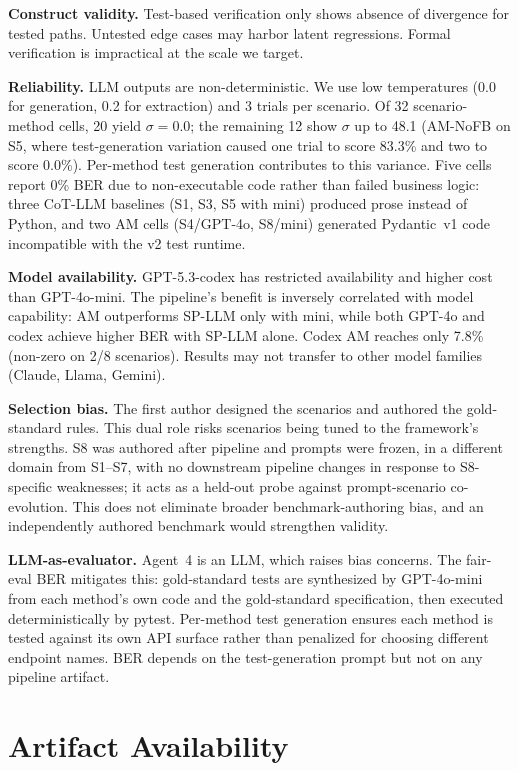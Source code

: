 \documentclass[conference]{IEEEtran}
\begin{document}
\textbf{Construct validity.} Test-based verification only shows absence of divergence for tested paths. Untested edge cases may harbor latent regressions. Formal verification is impractical at the scale we target.

\textbf{Reliability.} LLM outputs are non-deterministic. We use low temperatures (0.0 for generation, 0.2 for extraction) and 3 trials per scenario. Of 32 scenario-method cells, 20 yield $\sigma = 0.0$; the remaining 12 show $\sigma$ up to 48.1 (AM-NoFB on S5, where test-generation variation caused one trial to score 83.3\% and two to score 0.0\%). Per-method test generation contributes to this variance. Five cells report 0\% BER due to non-executable code rather than failed business logic: three CoT-LLM baselines (S1, S3, S5 with mini) produced prose instead of Python, and two AM cells (S4/GPT-4o, S8/mini) generated Pydantic~v1 code incompatible with the v2 test runtime.

\textbf{Model availability.} GPT-5.3-codex has restricted availability and higher cost than GPT-4o-mini. The pipeline's benefit is inversely correlated with model capability: AM outperforms SP-LLM only with mini, while both GPT-4o and codex achieve higher BER with SP-LLM alone. Codex AM reaches only 7.8\% (non-zero on 2/8 scenarios). Results may not transfer to other model families (Claude, Llama, Gemini).

\textbf{Selection bias.} The first author designed the scenarios and authored the gold-standard rules. This dual role risks scenarios being tuned to the framework's strengths. S8 was authored after pipeline and prompts were frozen, in a different domain from S1--S7, with no downstream pipeline changes in response to S8-specific weaknesses; it acts as a held-out probe against prompt-scenario co-evolution. This does not eliminate broader benchmark-authoring bias, and an independently authored benchmark would strengthen validity.

\textbf{LLM-as-evaluator.} Agent~4 is an LLM, which raises bias concerns. The fair-eval BER mitigates this: gold-standard tests are synthesized by GPT-4o-mini from each method's own code and the gold-standard specification, then executed deterministically by pytest. Per-method test generation ensures each method is tested against its own API surface rather than penalized for choosing different endpoint names. BER depends on the test-generation prompt but not on any pipeline artifact.

\section{Artifact Availability}
\end{document}
